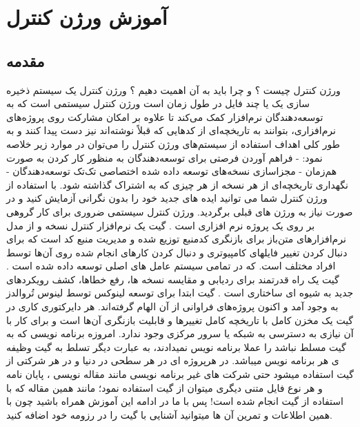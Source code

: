 \chapter{آموزش ورژن کنترل}




\section{مقدمه}
ورژن کنترل چیست ؟ و چرا باید به آن اهمیت دهیم ؟ ورژن کنترل یک سیستم ذخیره سازی یک یا چند فایل در طول زمان است \cite{Blischak2016} ورژن کنترل سیستمی است که به توسعه‌دهندگان نرم‌افزار کمک می‌کند تا علاوه بر امکان مشارکت روی پروژه‌های نرم‌افزاری، بتوانند به تاریخچه‌ای از کدهایی که قبلاً نوشته‌اند نیز دست پیدا کنند و به طور کلی اهداف استفاده از سیستم‌های ورژن کنترل را می‌توان در موارد زیر خلاصه نمود:\newline
- فراهم آوردن فرصتی برای توسعه‌دهندگان به منظور کار کردن به صورت هم‌زمان 
- مجزاسازی نسخه‌های توسعه داده شده اختصاصی تک‌تک توسعه‌دهندگان 
- نگهداری تاریخچه‌ای از هر نسخه از هر چیزی که به اشتراک گذاشته شود.\newline
با استفاده از ورژن کنترل شما می توانید ایده های جدید خود را بدون نگرانی آزمایش کنید و در صورت نیاز به ورژن های قبلی برگردید\cite{Chacon2014}. ورژن کنترل سیستمی ضروری برای کار گروهی بر روی یک پروژه نرم افزاری است \cite{DeAlwis2009} . \newline
گیت یک نرم‌افزار کنترل نسخه و از مدل نرم‌افزارهای متن‌باز برای بازنگری کدمنبع توزیع شده و مدیریت منبع کد است که برای دنبال کردن تغییر فایلهای کامپیوتری و دنبال کردن کارهای انجام شده روی آن‌ها توسط افراد مختلف است. که در تمامی سیستم عامل های اصلی توسعه داده شده است \cite{Ram2013} . گیت یک راه قدرتمند برای ردیابی و مقایسه نسخه ها، رفع خطاها، کشف رویکردهای جدید به شیوه ای ساختاری است\cite{spinellis2012git} .\newline
گیت ابتدا برای توسعه لینوکس توسط لینوس تُروالدز به وجود آمد و اکنون پروژه‌های فراوانی از آن الهام گرفته‌اند. هر دایرکتوری کاری در گیت یک مخزن کامل با تاریخچه کامل تغییرها و قابلیت بازنگری آن‌ها است و برای کار با آن نیازی به دسترسی به شبکه یا سرور مرکزی وجود ندارد.\newline
امروزه برنامه نویسی که به گیت مسلط نباشد را عملا برنامه نویس نمیدادند، به عبارت دیگر تسلط به گیت وظیفه ی هر برنامه نویس میباشد. در هرپروژه ای در هر سطحی در دنیا و در هر شرکتی از گیت استفاده میشود حتی شرکت های غیر برنامه نویسی مانند مقاله نویسی ، پایان نامه و هر نوع فایل متنی دیگری میتوان از گیت استفاده نمود؛ مانند همین مقاله که با استفاده از گیت انجام شده است! پس با ما در ادامه این آموزش همراه باشید چون با همین اطلاعات و تمرین آن ها میتوانید آشنایی با گیت را در رزومه خود اضافه کنید.


